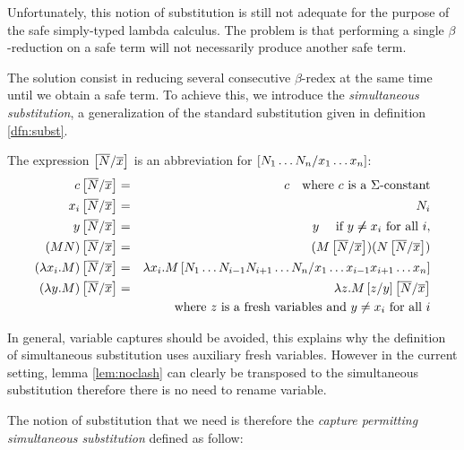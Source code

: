Unfortunately, this notion of substitution is still not adequate for
the purpose of the safe simply-typed lambda calculus. The problem is
that performing a single $\beta$-reduction on a safe term will not
necessarily produce another safe term.

The solution consist in reducing several consecutive $\beta$-redex at the same time until we obtain a safe
term. To achieve this, we introduce the \emph{simultaneous substitution},
a generalization of the standard substitution given in definition \ref{dfn:subst}.

\begin{dfn}
\label{dnf:simsubst}
 The expression $\left[ \overline{N}/\overline{x} \right]$ is an abbreviation for $\left[ N_1 \ldots N_n/x_1
\ldots x_n \right]$:
\begin{eqnarray*}
c \left[ \overline{N}/\overline{x} \right] &=& c \quad \mbox{where $c$ is a $\Sigma$-constant}\\
x_i \left[ \overline{N}/\overline{x} \right] &=& N_i\\
 y \left[ \overline{N}/\overline{x} \right] &=& y \quad \mbox{ if } y \not \neq x_i \mbox{ for all } i,\\
(M N) \left[ \overline{N}/\overline{x} \right] &=& (M \left[ \overline{N}/\overline{x} \right]) (N \left[ \overline{N}/\overline{x} \right]) \\
(\lambda x_i . M) \left[ \overline{N}/\overline{x} \right] &=& \lambda x_i
. M
\left[ N_1 \ldots N_{i-1} N_{i+1}\ldots N_n/x_1 \ldots x_{i-1} x_{i+1}\ldots x_n \right] \\
(\lambda y . M)
\left[ \overline{N}/\overline{x} \right] &=& \lambda z . M \left[ z/y \right] \left[ \overline{N}/\overline{x} \right] \\
&& \mbox{where $z$ is a fresh variables and } y \neq x_i \mbox{ for
all } i
\end{eqnarray*}
\end{dfn}

In general, variable captures should be avoided, this explains why
the definition of simultaneous substitution uses auxiliary fresh
variables. However in the current setting, lemma \ref{lem:noclash}
can clearly be transposed to the simultaneous substitution therefore
there is no need to rename variable.

The notion of substitution that we need is therefore the
\emph{capture permitting simultaneous substitution} defined as
follow:

